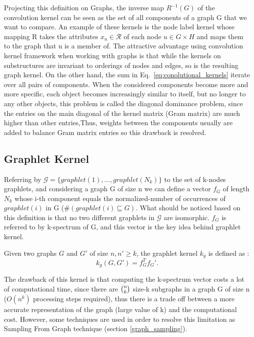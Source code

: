Projecting this definition on Graphs, the inverse map $R^{-1}(G)$ of the convolution kernel can be seen as the
set of all components of a graph G that we want to compare. An example of these kernels is the node label kernel whose mapping R takes the attributes $x_u\in \mathcal{R}$ of each node $u\in G\times H$ and maps them to the graph that u is a member of. The attractive advantage using convolution
kernel framework when working with graphs is that while the kernels on substructures are invariant to orderings of nodes and edges, so is the resulting graph kernel. On the other hand, the sum in Eq.~\ref{eq:conolutional_kernels} iterate over all pairs of components. When the considered components become more and more specific, each object becomes increasingly similar to itself, but no longer
to any other objects, this problem is called the diagonal dominance problem, since the entries on the main diagonal of the kernel matrix (Gram matrix) are much higher than other entries,Thus, weights between the components usually are added to balance Gram matrix entries so this drawback is resolved.


\subsection{Graphlet Kernel}
Referring by $\mathcal{G}=\{graphlet(1),..., graphlet(N_k)\}$ to the set of k-nodes graphlets, and considering a graph G of size n we can define a vector $f_G$ of length $N_k$ whose i-th component equals the normalized-number of occurrences of $graphlet(i)$ in G ($\#(graphlet(i)\sqsubseteq G)$. What should be noticed based on this definition is that no two different graphlets in $\mathcal{G}$ are isomorphic. $f_G$ is referred to by k-spectrum of G, and this vector is the key idea behind graphlet kernel. 


\begin{definition}
Given two graphs $G$ and $G'$ of size $n,n'\geq k$, the graphlet kernel $k_g$ is defined as \citep{graphlet_kernel}:
\begin{equation}
    k_g(G,G')=f_G^Tf_G'.
\end{equation}
\end{definition}


The drawback of this kernel is that computing the k-spectrum vector costs a lot of computational time, since there are $\tbinom{n}{k}$ size-k subgraphs in a graph G of size n ($O(n^k) $ processing steps required), thus there is a trade off between a more accurate representation of the graph (large value of k) and the computational cost. However, some techniques are used in order to resolve this limitation as Sampling From Graph technique (section \ref{graph_sampling}).

